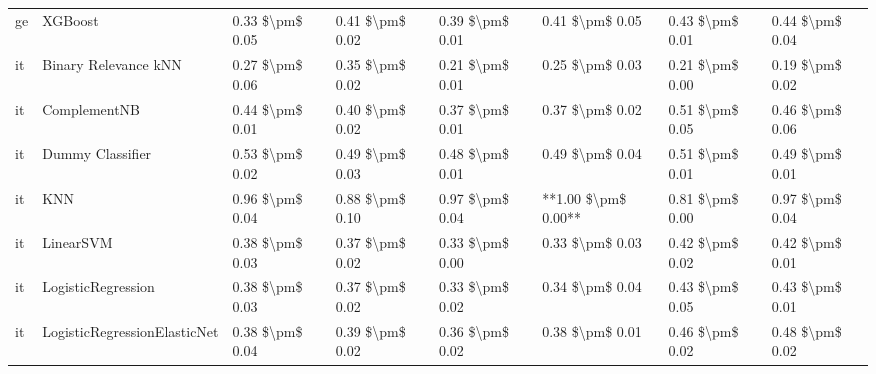 \begin{tabular}{llllllll}
      ge &                         XGBoost &     0.33 \$\textbackslash pm\$ 0.05 &           0.41 \$\textbackslash pm\$ 0.02 &       0.39 \$\textbackslash pm\$ 0.01 &        0.41 \$\textbackslash pm\$ 0.05 &                         0.43 \$\textbackslash pm\$ 0.01 &     0.44 \$\textbackslash pm\$ 0.04 \\
      it &            Binary Relevance kNN &     0.27 \$\textbackslash pm\$ 0.06 &           0.35 \$\textbackslash pm\$ 0.02 &       0.21 \$\textbackslash pm\$ 0.01 &        0.25 \$\textbackslash pm\$ 0.03 &                         0.21 \$\textbackslash pm\$ 0.00 &     0.19 \$\textbackslash pm\$ 0.02 \\
      it &                    ComplementNB &     0.44 \$\textbackslash pm\$ 0.01 &           0.40 \$\textbackslash pm\$ 0.02 &       0.37 \$\textbackslash pm\$ 0.01 &        0.37 \$\textbackslash pm\$ 0.02 &                         0.51 \$\textbackslash pm\$ 0.05 &     0.46 \$\textbackslash pm\$ 0.06 \\
      it &                Dummy Classifier &     0.53 \$\textbackslash pm\$ 0.02 &           0.49 \$\textbackslash pm\$ 0.03 &       0.48 \$\textbackslash pm\$ 0.01 &        0.49 \$\textbackslash pm\$ 0.04 &                         0.51 \$\textbackslash pm\$ 0.01 &     0.49 \$\textbackslash pm\$ 0.01 \\
      it &                             KNN &     0.96 \$\textbackslash pm\$ 0.04 &           0.88 \$\textbackslash pm\$ 0.10 &       0.97 \$\textbackslash pm\$ 0.04 &    **1.00 \$\textbackslash pm\$ 0.00** &                         0.81 \$\textbackslash pm\$ 0.00 &     0.97 \$\textbackslash pm\$ 0.04 \\
      it &                       LinearSVM &     0.38 \$\textbackslash pm\$ 0.03 &           0.37 \$\textbackslash pm\$ 0.02 &       0.33 \$\textbackslash pm\$ 0.00 &        0.33 \$\textbackslash pm\$ 0.03 &                         0.42 \$\textbackslash pm\$ 0.02 &     0.42 \$\textbackslash pm\$ 0.01 \\
      it &              LogisticRegression &     0.38 \$\textbackslash pm\$ 0.03 &           0.37 \$\textbackslash pm\$ 0.02 &       0.33 \$\textbackslash pm\$ 0.02 &        0.34 \$\textbackslash pm\$ 0.04 &                         0.43 \$\textbackslash pm\$ 0.05 &     0.43 \$\textbackslash pm\$ 0.01 \\
      it &    LogisticRegressionElasticNet &     0.38 \$\textbackslash pm\$ 0.04 &           0.39 \$\textbackslash pm\$ 0.02 &       0.36 \$\textbackslash pm\$ 0.02 &        0.38 \$\textbackslash pm\$ 0.01 &                         0.46 \$\textbackslash pm\$ 0.02 &     0.48 \$\textbackslash pm\$ 0.02 \\

\end{tabular}
